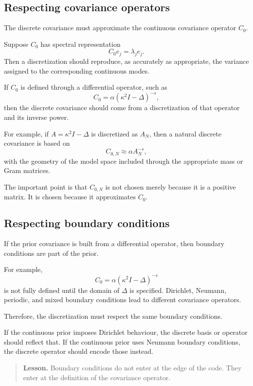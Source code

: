 \documentclass[11pt,a4paper]{book}
\newenvironment{lesson}
  {\begin{quote}\textbf{Lesson.}}
  {\end{quote}}
\begin{document}
\subsection{Respecting covariance operators}

The discrete covariance must approximate the continuous covariance operator
$C_0$.

Suppose $C_0$ has spectral representation
\[
    C_0 e_j=\lambda_j e_j.
\]
Then a discretization should reproduce, as accurately as appropriate, the
variance assigned to the corresponding continuous modes.

If $C_0$ is defined through a differential operator, such as
\[
    C_0
    =
    \alpha(\kappa^2 I-\Delta)^{-s},
\]
then the discrete covariance should come from a discretization of that operator
and its inverse power.

For example, if $A=\kappa^2 I-\Delta$ is discretized as $A_N$, then a natural
discrete covariance is based on
\[
    C_{0,N}
    \approx
    \alpha A_N^{-s},
\]
with the geometry of the model space included through the appropriate mass or
Gram matrices.

The important point is that $C_{0,N}$ is not chosen merely because it is a
positive matrix. It is chosen because it approximates $C_0$.

\subsection{Respecting boundary conditions}

If the prior covariance is built from a differential operator, then boundary
conditions are part of the prior.

For example,
\[
    C_0
    =
    \alpha(\kappa^2 I-\Delta)^{-s}
\]
is not fully defined until the domain of $\Delta$ is specified. Dirichlet,
Neumann, periodic, and mixed boundary conditions lead to different covariance
operators.

Therefore, the discretization must respect the same boundary conditions.

If the continuous prior imposes Dirichlet behaviour, the discrete basis or
operator should reflect that. If the continuous prior uses Neumann boundary
conditions, the discrete operator should encode those instead.

\begin{lesson}
Boundary conditions do not enter at the edge of the code. They enter at the
definition of the covariance operator.
\end{lesson}
\end{document}
